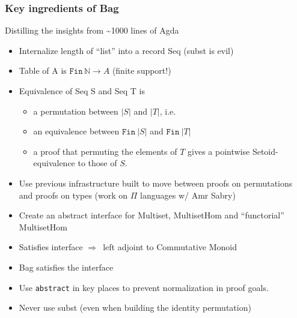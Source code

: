 \documentclass[serif,mathserif,professionalfont,10pt]{beamer}
\begin{document}
\begin{frame}
\frametitle{Key ingredients of Bag}
Distilling the insights from \textasciitilde1000 lines of Agda \pause
\begin{itemize}
\item Internalize length of ``list'' into a record Seq (subst is evil)
\item Table of A is $\texttt{Fin}\, \mathbb{N} \rightarrow A$ (finite
  support!)
\item Equivalence of Seq S and Seq T is
\begin{itemize}
\item a permutation between $|S|$ and $|T|$, i.e.
\item an equivalence between $\texttt{Fin}~ |S|$ and $\texttt{Fin}~ |T|$
\item a proof that permuting the elements of $T$ gives a
pointwise Setoid-equivalence to those of $S$.
\end{itemize}
\item Use previous infrastructure built to move between proofs
on permutations and proofs on types (work on $\Pi$ languages
w/ Amr Sabry)
\item Create an abstract interface for Multiset, MultisetHom and 
``functorial'' MultisetHom
\item Satisfies interface $\Rightarrow$\ left
adjoint to Commutative Monoid
\item Bag satisfies the interface
\item Use \texttt{abstract} in key places to prevent normalization
in proof goals.
\item Never use subst (even when building the identity permutation)
\end{itemize}
\end{frame}
\end{document}
